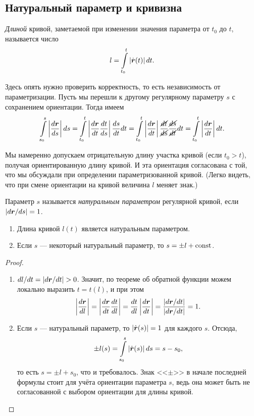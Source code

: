 \subsection{Натуральный параметр и кривизна}

\begin{definition}
	\textit{Длиной} кривой, заметаемой при изменении значения параметра от $t_0$ до $t$, называется число
	\[
		l = \int\limits_{t_0}^t\left\lvert\dot{\boldsymbol{r}}(t)\right\rvert dt.
	\]
\end{definition}

Здесь опять нужно проверить корректность, то есть независимость от параметризации. Пусть мы перешли к другому регулярному параметру $s$ с сохранением ориентации. Тогда имеем
\[
	\int\limits_{s_0}^s\left\lvert\frac{d\boldsymbol{r}}{ds}\right\rvert ds = \int\limits_{t_0}^t\left\lvert\frac{d\boldsymbol{r}}{dt}\frac{dt}{ds}\right\rvert\frac{ds}{dt}dt = \int\limits_{t_0}^t\left\lvert\frac{d\boldsymbol{r}}{dt}\right\rvert\frac{\cancel{dt}}{\cancel{ds}}\frac{\cancel{ds}}{\cancel{dt}}dt = \int\limits_{t_0}^t\left\lvert\frac{d\boldsymbol{r}}{dt}\right\rvert dt.
\]

Мы намеренно допускаем отрицательную длину участка кривой (если $t_0 > t$), получая ориентированную длину кривой. И эта ориентация согласована с той, что мы обсуждали при определении параметризованной кривой. (Легко видеть, что при смене ориентации на кривой величина $l$ меняет знак.)

\begin{definition}
	Параметр $s$ называется \textit{натуральным параметром} регулярной кривой, если $\left\lvert d\boldsymbol{r} / ds\right\rvert = 1$.
\end{definition}

\begin{proposition} \label{proposition:LengthParameter}
	\begin{enumerate}[nolistsep, label=(\arabic*)]
		\item Длина кривой $l(t)$ является натуральным параметром.
		\item Если $s$ --- некоторый натуральный параметр, то $s = \pm l + \mathrm{const}$.
	\end{enumerate}
\end{proposition}

\begin{proof}
	\begin{enumerate}[nolistsep, label=(\arabic*)]
		\item $dl / dt = \left\lvert d\boldsymbol{r} / dt\right\rvert > 0$. Значит, по теореме об обратной функции можем локально выразить $t = t(l)$, и при этом
			\[
				\left\lvert\frac{d\boldsymbol{r}}{dl}\right\rvert = \left\lvert\frac{d\boldsymbol{r}}{dt}\frac{dt}{dl}\right\rvert = \frac{dt}{dl}\left\lvert\frac{d\boldsymbol{r}}{dt}\right\rvert = \frac{\left\lvert d\boldsymbol{r} / dt\right\rvert}{\left\lvert d\boldsymbol{r} / dt\right\rvert} = 1.
			\]
		\item Если $s$ --- натуральный параметр, то $\left\lvert\dot{\boldsymbol{r}}(s)\right\rvert = 1$ для каждого $s$. Отсюда,
			\[
				\pm l(s) = \int\limits_{s_0}^s\left\lvert\dot{\boldsymbol{r}}(s)\right\rvert ds = s - s_0,
			\]
			то есть $s = \pm l + s_0$, что и требовалось. Знак <<$\pm$>> в начале последней формулы стоит для учёта ориентации параметра $s$, ведь она может быть не согласованной с выбором ориентации для длины кривой.
	\end{enumerate}
\end{proof}

